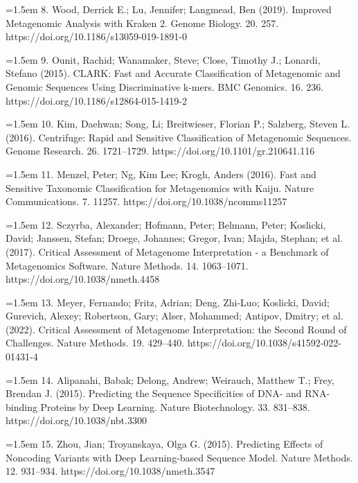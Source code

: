 \documentclass[10.5pt]{article}
\begin{document}
\hangindent=1.5em  8. Wood, Derrick E.; Lu, Jennifer; Langmead, Ben (2019). Improved Metagenomic Analysis with Kraken 2. Genome Biology. 20. 257. https://doi.org/10.1186/s13059-019-1891-0\par

\hangindent=1.5em  9. Ounit, Rachid; Wanamaker, Steve; Close, Timothy J.; Lonardi, Stefano (2015). CLARK: Fast and Accurate Classification of Metagenomic and Genomic Sequences Using Discriminative k-mers. BMC Genomics. 16. 236. https://doi.org/10.1186/s12864-015-1419-2\par

\hangindent=1.5em  10. Kim, Daehwan; Song, Li; Breitwieser, Florian P.; Salzberg, Steven L. (2016). Centrifuge: Rapid and Sensitive Classification of Metagenomic Sequences. Genome Research. 26. 1721--1729. https://doi.org/10.1101/gr.210641.116\par

\hangindent=1.5em  11. Menzel, Peter; Ng, Kim Lee; Krogh, Anders (2016). Fast and Sensitive Taxonomic Classification for Metagenomics with Kaiju. Nature Communications. 7. 11257. https://doi.org/10.1038/ncomms11257\par

\hangindent=1.5em  12. Sczyrba, Alexander; Hofmann, Peter; Belmann, Peter; Koslicki, David; Janssen, Stefan; Droege, Johannes; Gregor, Ivan; Majda, Stephan; et al. (2017). Critical Assessment of Metagenome Interpretation - a Benchmark of Metagenomics Software. Nature Methods. 14. 1063--1071. https://doi.org/10.1038/nmeth.4458\par

\hangindent=1.5em  13. Meyer, Fernando; Fritz, Adrian; Deng, Zhi-Luo; Koslicki, David; Gurevich, Alexey; Robertson, Gary; Alser, Mohammed; Antipov, Dmitry; et al. (2022). Critical Assessment of Metagenome Interpretation: the Second Round of Challenges. Nature Methods. 19. 429--440. https://doi.org/10.1038/s41592-022-01431-4\par

\hangindent=1.5em  14. Alipanahi, Babak; Delong, Andrew; Weirauch, Matthew T.; Frey, Brendan J. (2015). Predicting the Sequence Specificities of DNA- and RNA-binding Proteins by Deep Learning. Nature Biotechnology. 33. 831--838. https://doi.org/10.1038/nbt.3300\par

\hangindent=1.5em  15. Zhou, Jian; Troyanskaya, Olga G. (2015). Predicting Effects of Noncoding Variants with Deep Learning-based Sequence Model. Nature Methods. 12. 931--934. https://doi.org/10.1038/nmeth.3547\par
\end{document}
